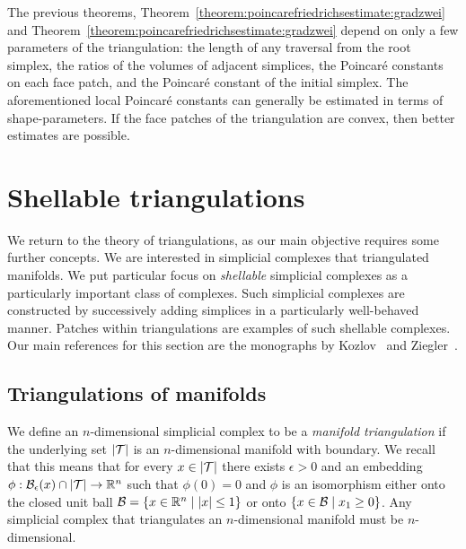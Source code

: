 \documentclass[a4paper]{article}
\begin{document}
\begin{remark}
    The previous theorems, Theorem~\ref{theorem:poincarefriedrichsestimate:gradzwei} and Theorem~\ref{theorem:poincarefriedrichsestimate:gradzwei} 
    depend on only a few parameters of the triangulation:
    the length of any traversal from the root simplex, the ratios of the volumes of adjacent simplices,
    the Poincar\'e constants on each face patch, and the Poincar\'e constant of the initial simplex. 
    The aforementioned local Poincar\'e constants can generally be estimated in terms of shape-parameters. 
    If the face patches of the triangulation are convex, then better estimates are possible. 
\end{remark}
























\section{Shellable triangulations}\label{section:advancedtriangulations}

We return to the theory of triangulations,
as our main objective requires some further concepts.
We are interested in simplicial complexes that triangulated manifolds. 
We put particular focus on \emph{shellable} simplicial complexes as a particularly important class of complexes. Such simplicial complexes are constructed by successively adding simplices in a particularly well-behaved manner. Patches within triangulations are examples of such shellable complexes. 
Our main references for this section are the monographs by Kozlov~\cite{kozlov2008combinatorial} and Ziegler~\cite{ziegler2012lectures}. 

\subsection{Triangulations of manifolds}

We define an $n$-dimensional simplicial complex to be a \emph{manifold triangulation} if the underlying set $\left| {\mathcal T} \right|$ is an $n$-dimensional manifold with boundary.
We recall that this means that for every $x \in \left| {\mathcal T} \right|$
there exists $\epsilon > 0$ and an embedding $\phi : {\mathcal B}_\epsilon(x) \cap \left| {\mathcal T} \right| \rightarrow {\mathbb R}^{n}$
such that $\phi(0) = 0$ and $\phi$ is an isomorphism either onto the closed unit ball $\calB = \{ x \in \bbR^{n} \suchthat |x| \leq 1 \}$
or onto $\{ x \in \calB \suchthat x_1 \geq 0 \}$.
Any simplicial complex that triangulates an $n$-dimensional manifold must be $n$-dimensional.
\end{document}
